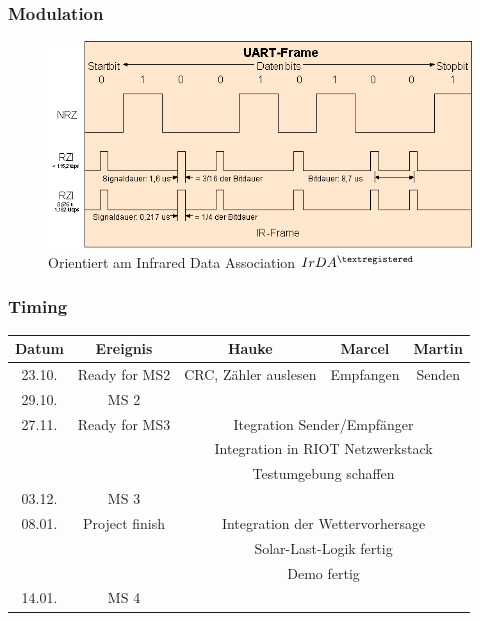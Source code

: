 \documentclass{beamer}
\begin{document}

\begin{frame} %
  \frametitle{ Modulation } %
  \begin{figure}
  	\begin{center}
  		\includegraphics[scale=0.5]{Medien/Modulation.PNG}\\
  		Orientiert am Infrared Data Association $IrDA^{\textregistered}$
  	\end{center}
  \end{figure}
\end{frame}

\begin{frame}
	\frametitle{ Timing }
		\small
		\begin{tabular}{|c|c|c|c|c|}
		\hline 
		Datum  & Ereignis & Hauke & Marcel & Martin \\ 
		\hline 
		23.10. & Ready for MS2 & CRC, Zähler auslesen & Empfangen & Senden \\ 
		\hline 
		29.10. & MS 2 & & &\\
		\hline 
		27.11. & Ready for MS3 & \multicolumn{3}{|c|}{ Itegration Sender/Empfänger } \\
		&  & \multicolumn{3}{|c|}{ Integration in RIOT Netzwerkstack }\\
		&  & \multicolumn{3}{|c|}{ Testumgebung schaffen }\\
		\hline 
		03.12. & MS 3 & & & \\ 
		\hline 
	  08.01. & Project finish & \multicolumn{3}{|c|}{ Integration der Wettervorhersage } \\  
		&  & \multicolumn{3}{|c|}{ Solar-Last-Logik fertig }\\
		&  & \multicolumn{3}{|c|}{ Demo fertig }\\
		\hline
		14.01. & MS 4 & & & \\ 
		\hline 
		\end{tabular} 
\end{frame}
\end{document}
